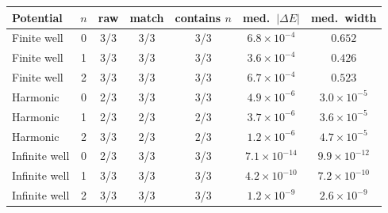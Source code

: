 \footnotesize
\setlength{\tabcolsep}{4pt}
\begin{tabular}{lcccccc}
\toprule
Potential & $n$ & raw & match & contains $n$ & med.\ $|\Delta E|$ & med.\ width \\
\midrule
Finite well & 0 & 3/3 & 3/3 & 3/3 & $6.8\times10^{-4}$ & $0.652$ \\
Finite well & 1 & 3/3 & 3/3 & 3/3 & $3.6\times10^{-4}$ & $0.426$ \\
Finite well & 2 & 3/3 & 3/3 & 3/3 & $6.7\times10^{-4}$ & $0.523$ \\
Harmonic & 0 & 2/3 & 3/3 & 3/3 & $4.9\times10^{-6}$ & $3.0\times10^{-5}$ \\
Harmonic & 1 & 2/3 & 2/3 & 2/3 & $3.7\times10^{-6}$ & $3.6\times10^{-5}$ \\
Harmonic & 2 & 3/3 & 2/3 & 2/3 & $1.2\times10^{-6}$ & $4.7\times10^{-5}$ \\
Infinite well & 0 & 2/3 & 3/3 & 3/3 & $7.1\times10^{-14}$ & $9.9\times10^{-12}$ \\
Infinite well & 1 & 3/3 & 3/3 & 3/3 & $4.2\times10^{-10}$ & $7.2\times10^{-10}$ \\
Infinite well & 2 & 3/3 & 3/3 & 3/3 & $1.2\times10^{-9}$ & $2.6\times10^{-9}$ \\
\bottomrule
\end{tabular}
